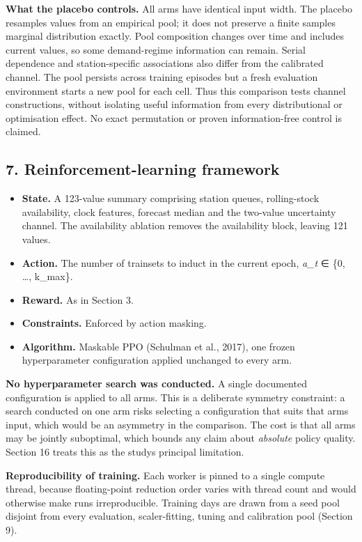 \documentclass[
]{article}
\providecommand{\tightlist}{%
  \setlength{\itemsep}{0pt}\setlength{\parskip}{0pt}}
\begin{document}
\textbf{What the placebo controls.} All arms have identical input width.
The placebo resamples values from an empirical pool; it does not
preserve a finite sample\textquotesingle s marginal distribution
exactly. Pool composition changes over time and includes current values,
so some demand-regime information can remain. Serial dependence and
station-specific associations also differ from the calibrated channel.
The pool persists across training episodes but a fresh evaluation
environment starts a new pool for each cell. Thus this comparison tests
channel constructions, without isolating useful information from every
distributional or optimisation effect. No exact permutation or proven
information-free control is claimed.

\subsection{7. Reinforcement-learning
framework}\label{7-reinforcement-learning-framework}

\begin{itemize}
\tightlist
\item
  \textbf{State.} A 123-value summary comprising station queues,
  rolling-stock availability, clock features, forecast median and the
  two-value uncertainty channel. The availability ablation removes the
  availability block, leaving 121 values.
\item
  \textbf{Action.} The number of trainsets to induct in the current
  epoch, \emph{a\_t} ∈ \{0, \ldots, k\_max\}.
\item
  \textbf{Reward.} As in Section 3.
\item
  \textbf{Constraints.} Enforced by action masking.
\item
  \textbf{Algorithm.} Maskable PPO (Schulman et al., 2017), one frozen
  hyperparameter configuration applied unchanged to every arm.
\end{itemize}

\textbf{No hyperparameter search was conducted.} A single documented
configuration is applied to all arms. This is a deliberate symmetry
constraint: a search conducted on one arm risks selecting a
configuration that suits that arm\textquotesingle s input, which would
be an asymmetry in the comparison. The cost is that all arms may be
jointly suboptimal, which bounds any claim about \emph{absolute} policy
quality. Section 16 treats this as the study\textquotesingle s principal
limitation.

\textbf{Reproducibility of training.} Each worker is pinned to a single
compute thread, because floating-point reduction order varies with
thread count and would otherwise make runs irreproducible. Training days
are drawn from a seed pool disjoint from every evaluation,
scaler-fitting, tuning and calibration pool (Section 9).
\end{document}
